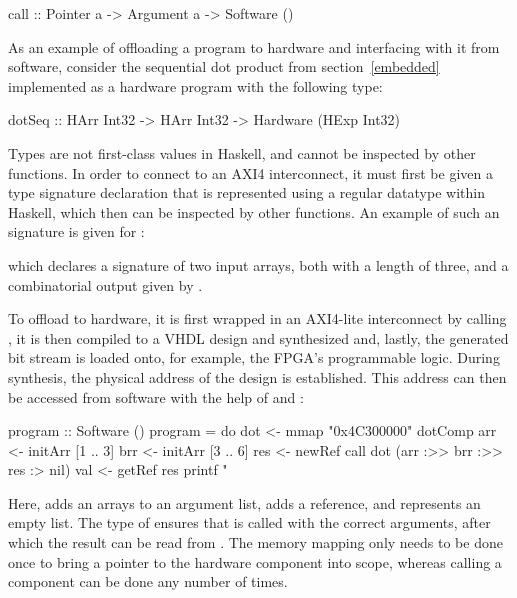 \documentclass[../paper.tex]{subfiles}
\begin{document}
\begin{code}
call :: Pointer a -> Argument a -> Software ()
\end{code}

As an example of offloading a program to hardware and interfacing with it from software, consider the sequential dot product from section~\ref{embedded} implemented as a hardware program with the following type:

\begin{code}
dotSeq :: HArr Int32 -> HArr Int32 -> Hardware (HExp Int32)
\end{code}

\noindent Types are not first-class values in Haskell, and cannot be inspected by other functions. In order to connect  to an AXI4 interconnect, it must first be given a type signature declaration that is represented using a regular datatype within Haskell, which then can be inspected by other functions. An example of such an signature is given for :


\noindent which declares a signature of two input arrays, both with a length of three, and a combinatorial output given by .

To offload  to hardware, it is first wrapped in an AXI4-lite interconnect by calling , it is then compiled to a VHDL design and synthesized and, lastly, the generated bit stream is loaded onto, for example, the FPGA's programmable logic. During synthesis, the physical address of the design is established. This address can then be accessed from software with the help of  and :

\begin{code}
program :: Software ()
program = do
  dot <- mmap "0x4C300000" dotComp
  arr <- initArr [1 .. 3]
  brr <- initArr [3 .. 6]
  res <- newRef
  call dot (arr :>> brr :>> res :> nil)
  val <- getRef res
  printf "%
\end{code}

\noindent Here, \codei{(:>>)} adds an arrays to an argument list, \codei{(:>)} adds a reference, and  represents an empty list. The type of  ensures that  is called with the correct arguments, after which the result can be read from . The memory mapping only needs to be done once to bring a pointer to the hardware component into scope, whereas calling a component can be done any number of times.
\end{document}
